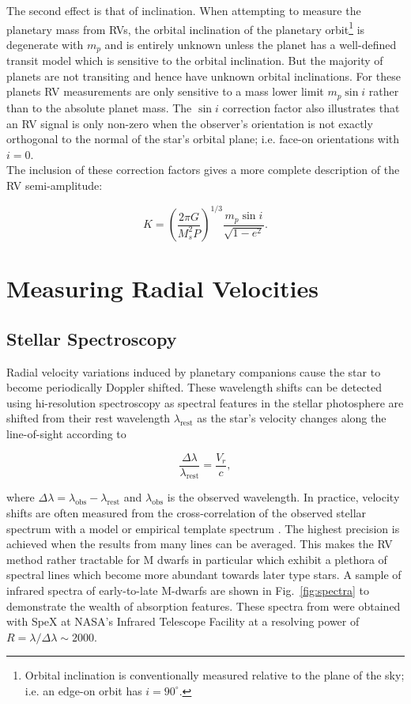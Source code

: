 The second effect is that of inclination. When attempting to measure the planetary 
mass from RVs, the orbital inclination of the planetary orbit\footnote{Orbital 
inclination is conventionally measured  relative 
to the plane of the sky; i.e. an edge-on orbit has $i=90^{\circ}$.} is degenerate with
$m_p$ and is entirely unknown unless the planet has a well-defined transit model which is sensitive
to the orbital inclination. But the majority of planets are not transiting and hence have unknown
orbital inclinations. For these planets RV measurements 
are only sensitive to a mass lower limit $m_p\sin{i}$ rather than to the absolute planet mass.
The $\sin{i}$ correction factor also illustrates that an RV signal is only non-zero when
the observer's orientation is not exactly orthogonal to the normal of the star's orbital plane;
i.e. face-on orientations with $i=0$. \\

The inclusion of these correction factors gives a more complete description of the RV semi-amplitude: 

\begin{equation}
K = \left( \frac{2\pi G}{M_s^2 P} \right)^{1/3} \frac{m_p \sin{i}}{\sqrt{1-e^2}}. 
\label{eq:K2}
\end{equation}

\section{Measuring Radial Velocities} \label{sect:spectrograph}
\subsection{Stellar Spectroscopy}
Radial velocity variations induced by planetary companions cause the star to become 
periodically Doppler shifted. These wavelength shifts can be detected using hi-resolution 
spectroscopy as spectral features in the stellar photosphere are shifted from their 
rest wavelength $\lambda_{\text{rest}}$ as the star's velocity changes along the line-of-sight 
according to 

\begin{equation}
\frac{\Delta \lambda}{\lambda_{\text{rest}}} = \frac{V_r}{c},
\end{equation}

\noindent where $\Delta \lambda = \lambda_{\text{obs}}-\lambda_{\text{rest}}$ and
$\lambda_{\text{obs}}$ is the observed wavelength. 
In practice, velocity shifts are often measured from the cross-correlation of 
the observed stellar spectrum with a model or empirical template spectrum \citep{astudillodefru15}.
The highest precision is achieved when the results from many lines can be averaged. This makes
the RV method rather tractable for M dwarfs in particular which exhibit a plethora of 
spectral lines which become more abundant towards later type stars.
A sample of infrared spectra of early-to-late M-dwarfs 
are shown in Fig.~\ref{fig:spectra} to demonstrate the wealth of absorption features. 
These spectra from \cite{rayner09} were obtained 
with SpeX at NASA's Infrared Telescope Facility at a resolving power of 
$R=\lambda / \Delta \lambda \sim 2000$. \\ 

